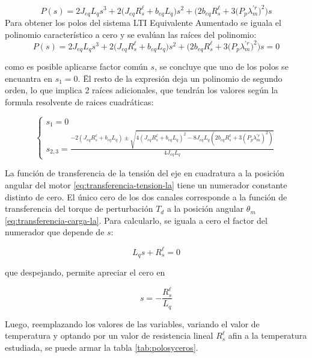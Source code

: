 \documentclass[blue,fullpaper]{ludusofficial}  %
\begin{document}
\begin{equation}
\label{eq:polinomio-la}
P(s) = 2J_{eq}L_qs^3+2\Big(J_{eq}R_s^\ell+b_{eq}L_q\Big)s^2+\Big(2b_{eq}R_s^\ell+3\Big(P_p\lambda^{'r}_m\Big)^2\Big)s
\end{equation}
Para obtener los polos del sistema LTI Equivalente Aumentado se iguala el polinomio característico a cero y se evalúan las raíces del polinomio:
\begin{equation*}
P(s) = 2J_{eq}L_qs^3+2\Big(J_{eq}R_s^\ell+b_{eq}L_q\Big)s^2+\Big(2b_{eq}R_s^\ell+3\Big(P_p\lambda^{'r}_m\Big)^2\Big)s=0
\end{equation*}

como es posible aplicarse factor común $s$, se concluye que uno de los polos se encuantra en $s_1=0$. Ël resto de la expresión deja un polinomio de segundo orden, lo que implica 2 raíces adicionales, que tendrán los valores según la formula resolvente de raices cuadráticas: 

\begin{equation}
\label{eq:polos-la}
    \begin{cases} 
        s_1 = 0 \\ 
        s_{2,3} = \frac{-2\left(J_{eq}R_s^\ell+b_{eq}L_q\right) \pm \sqrt{4\left(J_{eq}R_s^\ell+b_{eq}L_q\right)^2 - 8J_{eq}L_q\left(2b_{eq}R_s^\ell+3\left(P_p\lambda^{'r}_m\right)^2\right)}}{4J_{eq}L_q} 
    \end{cases}
\end{equation}

La función de transferencia de la tensión del eje en cuadratura
a la posición angular del motor \eqref{eq:transferencia-tension-la}
tiene un numerador constante distinto de cero. El único cero
de los dos canales corresponde a la función de transferencia del
torque de perturbación $T_d$ a la posición angular $\theta_m$
\eqref{eq:transferencia-carga-la}. Para calcularlo, se iguala a cero
el factor del numerador que depende de $s$:

\begin{equation*}
    L_qs+R^\ell_s=0
\end{equation*}

que despejando, permite apreciar el cero en 

\begin{equation}
\label{eq:cero-carga-la}
    s=-\frac{R^\ell_s}{L_q}
\end{equation}

Luego, reemplazando los valores de las variables, variando el valor de temperatura y optando por un valor de resistencia lineal $R_s^\ell$ afin a la temperatura estudiada, se puede armar la tabla \ref{tab:polosyceros}.
\end{document}
